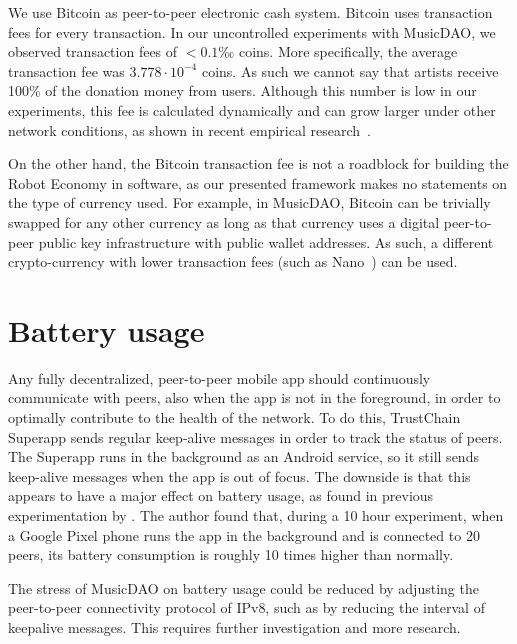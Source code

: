 We use Bitcoin as peer-to-peer electronic cash system. Bitcoin uses transaction fees for every transaction. In our uncontrolled experiments with MusicDAO, we observed transaction fees of $<0.1‰$ coins. More specifically, the average transaction fee was $3.778\cdot10^{-4}$ coins. As such we cannot say that artists receive 100\% of the donation money from users. Although this number is low in our experiments, this fee is calculated dynamically and can grow larger under other network conditions, as shown in recent empirical research~\citep{moser2015trends}. 

On the other hand, the Bitcoin transaction fee is not a roadblock for building the Robot Economy in software, as our presented framework makes no statements on the type of currency used. For example, in MusicDAO, Bitcoin can be trivially swapped for any other currency as long as that currency uses a digital peer-to-peer public key infrastructure with public wallet addresses. As such, a different crypto-currency with lower transaction fees (such as Nano~\citep{lemahieu2018nano}) can be used.

\section{Battery usage}
Any fully decentralized, peer-to-peer mobile app should continuously communicate with peers, also when the app is not in the foreground, in order to optimally contribute to the health of the network. To do this, TrustChain Superapp sends regular keep-alive messages in order to track the status of peers. The Superapp runs in the background as an Android service, so it still sends keep-alive messages when the app is out of focus. The downside is that this appears to have a major effect on battery usage, as found in previous experimentation by \cite{mattskala2020}. The author found that, during a 10 hour experiment, when a Google Pixel phone runs the app in the background and is connected to 20 peers, its battery consumption is roughly 10 times higher than normally.

The stress of MusicDAO on battery usage could be reduced by adjusting the peer-to-peer connectivity protocol of IPv8, such as by reducing the interval of keepalive messages. This requires further investigation and more research.